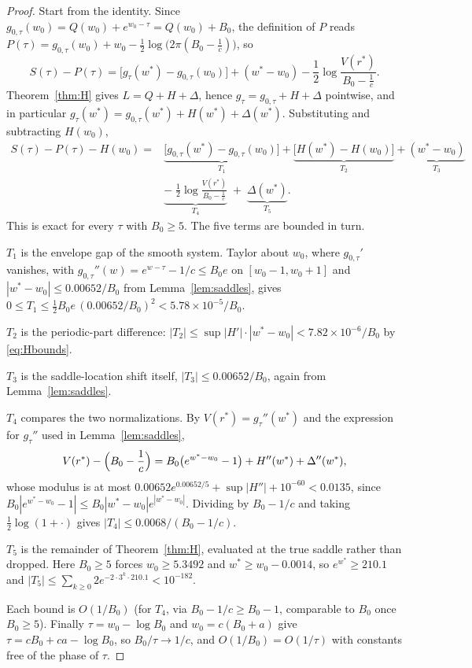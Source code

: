 \documentclass[11pt]{article}
\theoremstyle{definition}
\theoremstyle{remark}
\begin{document}
\begin{proof}
Start from the identity. Since $g_{0,\tau}(w_0) = Q(w_0)+e^{w_0-\tau} = Q(w_0)+B_0$, the definition
of $P$ reads $P(\tau) = g_{0,\tau}(w_0)+w_0-\tfrac12\log\bigl(2\pi(B_0-\tfrac1c)\bigr)$, so
\[
S(\tau)-P(\tau) = \bigl[g_\tau(w^*)-g_{0,\tau}(w_0)\bigr]+(w^*-w_0)
-\frac12\log\frac{V(r^*)}{B_0-\tfrac1c}.
\]
Theorem~\ref{thm:H} gives $L = Q+H+\Delta$, hence $g_\tau = g_{0,\tau}+H+\Delta$ pointwise, and in
particular $g_\tau(w^*) = g_{0,\tau}(w^*)+H(w^*)+\Delta(w^*)$. Substituting and subtracting
$H(w_0)$,
\begin{equation}
\label{eq:envfive}
\begin{split}
S(\tau)-P(\tau)-H(w_0) = {}& \underbrace{\bigl[g_{0,\tau}(w^*)-g_{0,\tau}(w_0)\bigr]}_{T_1}
+\underbrace{\bigl[H(w^*)-H(w_0)\bigr]}_{T_2}
+\underbrace{(w^*-w_0)}_{T_3} \\[2pt]
&{}\underbrace{-\;\frac12\log\frac{V(r^*)}{B_0-\tfrac1c}}_{T_4}
\;+\;\underbrace{\Delta(w^*)}_{T_5}.
\end{split}
\end{equation}
This is exact for every $\tau$ with $B_0\ge5$. The five terms are bounded in turn.

$T_1$ is the envelope gap of the smooth system. Taylor about $w_0$, where $g_{0,\tau}'$ vanishes,
with $g_{0,\tau}''(w) = e^{w-\tau}-1/c \le B_0e$ on $[w_0-1,w_0+1]$ and $|w^*-w_0| \le 0.00652/B_0$
from Lemma~\ref{lem:saddles}, gives $0\le T_1 \le \tfrac12 B_0e\,(0.00652/B_0)^2 <
5.78\times10^{-5}/B_0$.

$T_2$ is the periodic-part difference: $|T_2| \le \sup|H'|\cdot|w^*-w_0| < 7.82\times10^{-6}/B_0$ by
\eqref{eq:Hbounds}.

$T_3$ is the saddle-location shift itself, $|T_3| \le 0.00652/B_0$, again from
Lemma~\ref{lem:saddles}.

$T_4$ compares the two normalizations. By $V(r^*) = g_\tau''(w^*)$ and the expression for
$g_\tau''$ used in Lemma~\ref{lem:saddles},
\[
V(r^*)-\Bigl(B_0-\frac1c\Bigr) = B_0\bigl(e^{w^*-w_0}-1\bigr)+H''(w^*)+\Delta''(w^*),
\]
whose modulus is at most $0.00652e^{0.00652/5}+\sup|H''|+10^{-60} < 0.0135$, since
$B_0|e^{w^*-w_0}-1| \le B_0|w^*-w_0|e^{|w^*-w_0|}$. Dividing by $B_0-1/c$ and taking
$\tfrac12\log(1+\cdot)$ gives $|T_4| \le 0.0068/(B_0-1/c)$.

$T_5$ is the remainder of Theorem~\ref{thm:H}, evaluated at the true saddle rather than dropped.
Here $B_0\ge5$ forces $w_0\ge5.3492$ and $w^*\ge w_0-0.0014$, so $e^{w^*}\ge210.1$ and
$|T_5| \le \sum_{k\ge0}2e^{-2\cdot3^k\cdot210.1} < 10^{-182}$.

Each bound is $O(1/B_0)$ (for $T_4$, via $B_0-1/c\ge B_0-1$, comparable to $B_0$ once $B_0\ge5$).
Finally $\tau = w_0-\log B_0$ and
$w_0 = c(B_0+a)$ give $\tau = cB_0+ca-\log B_0$, so $B_0/\tau \to 1/c$, and $O(1/B_0) = O(1/\tau)$
with constants free of the phase of $\tau$.
\end{proof}
\end{document}
